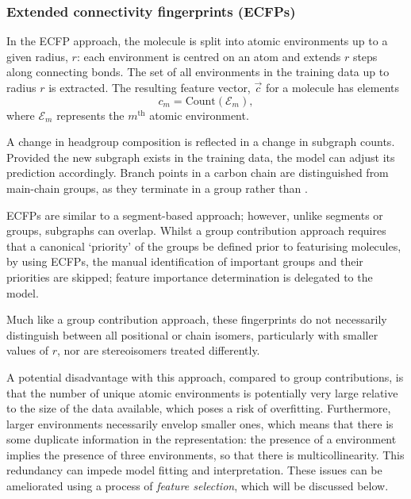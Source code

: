 \subsubsection{Extended connectivity fingerprints (ECFPs)}

In the ECFP approach, the molecule is split into atomic environments up to a
given radius, $r$: each environment is centred on an atom and extends $r$ steps
along connecting bonds. The set of all environments in the training data up to
radius $r$ is extracted. The resulting feature vector, $\vec{c}$ for a molecule
has elements
\begin{equation}
    \label{eq:ecfp}
    c_m = \text{Count}(\mathcal{E}_m),
\end{equation}
where $\mathcal{E}_m$ represents the $m^\text{th}$ atomic environment.

A change in headgroup composition is reflected in a change in subgraph counts.
Provided the new subgraph exists in the training data, the model can adjust its
prediction accordingly. Branch points in a carbon chain are distinguished from
main-chain groups, as they terminate in a  group rather than .

ECFPs are similar to a segment-based approach; however, unlike segments or
groups, subgraphs can overlap. Whilst a group contribution approach requires
that a canonical `priority' of the groups be defined prior to featurising
molecules, by using ECFPs, the manual identification of important groups and
their priorities are skipped; feature importance determination is delegated to
the model.

Much like a group contribution approach, these fingerprints do not necessarily
distinguish between all positional or chain isomers, particularly with smaller
values of $r$, nor are stereoisomers treated differently.

A potential disadvantage with this approach, compared to group contributions, is
that the number of unique atomic environments is potentially very large relative
to the size of the data available, which poses a risk of overfitting.
Furthermore, larger environments necessarily envelop smaller ones, which means
that there is some duplicate information in the representation: the presence of
a  environment implies the presence of three  environments,
so that there is multicollinearity. This redundancy can impede model fitting and
interpretation. These issues can be ameliorated using a process of
\emph{feature selection}, which will be discussed below.


